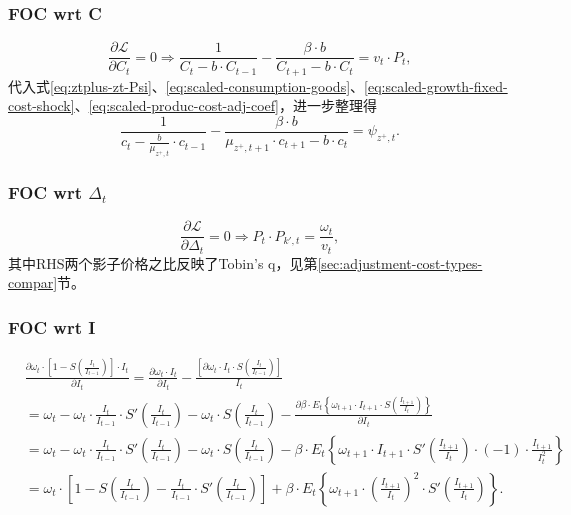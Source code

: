 \subsubsection{FOC wrt C}
\begin{equation}
\label{eq:HH-max-FOC-C-intm}
 \frac{\partial \mathcal{L}}{\partial C_t} = 0 \Rightarrow \frac{1}{C_t - b \cdot C_{t-1}} -  \frac{\beta \cdot b}{C_{t+1} - b \cdot C_t} = v_t \cdot P_t,
\end{equation}
代入式\eqref{eq:ztplus-zt-Psi}、\eqref{eq:scaled-consumption-goods}、\eqref{eq:scaled-growth-fixed-cost-shock}、\eqref{eq:scaled-produc-cost-adj-coef}，进一步整理得
\begin{equation}
\label{eq:HH-max-FOC-C}
\frac{1}{
  c_t - \frac{b}{\mu_{z^+,t}} \cdot c_{t-1}
}
- \frac{\beta \cdot b}{
  \mu_{z^+,t+1} \cdot c_{t+1}  - b \cdot c_t
}
=\psi_{z^+,t}.
\end{equation}

\subsubsection{FOC wrt $\Delta_t$}
\label{sec:FOC-wrt-Delta-t}
\begin{equation}
\label{eq:HH-max-FOC-Delta-t}
\frac{\partial \mathcal{L}}{\partial \Delta_t} = 0 \Rightarrow P_t \cdot P_{k',t} = \frac{\omega_t}{v_t},
\end{equation}
其中RHS两个影子价格之比反映了Tobin's q，见第\ref{sec:adjustment-cost-types-compar}节。

\subsubsection{FOC wrt I}
\label{sec:FOC-wrt-I}
\begin{equation}
\label{eq:S-I-t-1-partial-I}
\begin{split}
&\frac{\partial \omega_t \cdot \left[1-S \left(\frac{I_t}{I_{t-1}}\right)\right] \cdot I_t}{\partial I_t}  =\frac{\partial \omega_t \cdot I_t}{\partial I_t} - \frac{
 \left[ \partial \omega_t \cdot I_t \cdot S \left(\frac{I_t}{I_{t-1}}\right)\right]
}{I_t} \\
&=\omega_t
- \omega_t \cdot \frac{I_t}{I_{t-1}} \cdot S'\left(\frac{I_t}{I_{t-1}}\right)
- \omega_t \cdot S\left(\frac{I_t}{I_{t-1}}\right)
- \frac{
  \partial \beta \cdot E_t \left\{
  \omega_{t+1} \cdot I_{t+1} \cdot S\left(\frac{I_{t+1}}{I_{t}}\right)
  \right\}
}{\partial I_t} \\
&= \omega_t
- \omega_t \cdot \frac{I_t}{I_{t-1}} \cdot S'\left(\frac{I_t}{I_{t-1}}\right)
- \omega_t \cdot S\left(\frac{I_t}{I_{t-1}}\right) - \beta \cdot E_t \left\{
  \omega_{t+1} \cdot I_{t+1} \cdot S'\left(\frac{I_{t+1}}{I_{t}}\right) \cdot \left(-1\right) \cdot \frac{I_{t+1}}{I_t^2}
\right\} \\
&= \omega_t \cdot \left[
  1- S\left(\frac{I_t}{I_{t-1}}\right) - \frac{I_t}{I_{t-1}} \cdot S'\left(\frac{I_t}{I_{t-1}}\right)
\right]
  + \beta \cdot E_t \left\{\omega_{t+1} \cdot \left(\frac{I_{t+1}}{I_{t}}\right)^2 \cdot S'\left(\frac{I_{t+1}}{I_{t}}\right)\right\}.
  \end{split}
\end{equation}

